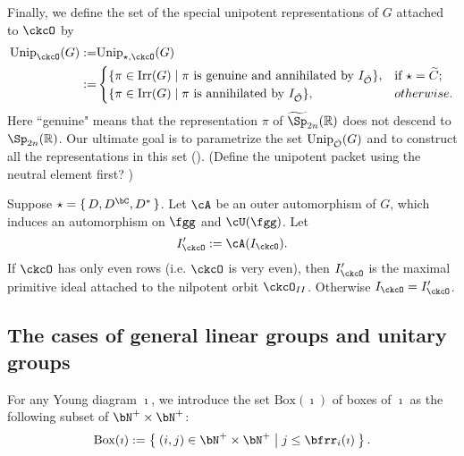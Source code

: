 \documentclass[counting_main.tex]{subfiles}
\begin{document}
Finally, we define the set of the special unipotent representations of $G$
attached to $\ckcO$ by
\[
  \begin{split}
    \Unip_{\ckcO}(G):=&  \Unip_{\star, \ckcO}(G) \\
    :=& \begin{cases}
      \{\pi\in \Irr(G)\mid \pi \textrm{ is genuine  and annihilated by } I_{\check \CO}\}, & \text{if } \star =\widetilde C;\\
      \{\pi\in \Irr(G)\mid \pi \textrm{ is annihilated by } I_{\check \CO}\}, & otherwise.\\
    \end{cases}
  \end{split}
\]
Here ``genuine" means that the representation $\pi$ of $\widetilde \Sp_{2n}(\R)$
does not descend to $\Sp_{2n}(\R)$. Our ultimate goal is to parametrize the set
$\mathrm{Unip}_{\check {{\mathcal {O}}}}(G)$ and to construct all the representations in this set
(\cite{BMSZ2}).
(Define the unipotent packet using the neutral element first? )

\begin{remark}
  Suppose $\star=\set{D,D^{\bC},D^{*}}$.
  Let $\cA$ be an outer automorphism of $G$, which induces an automorphism on
  $\fgg$ and $\cU(\fgg)$.
  Let
  \[
  I'_{\ckcO}:=\cA(I_{\ckcO}).
  \]
  If $\ckcO$ has only even rows (i.e. $\ckcO$ is very even),
  then $I'_{\ckcO}$ is the maximal primitive ideal attached to the nilpotent
  orbit $\ckcO_{II}$.
  Otherwise $I_{\ckcO}=I'_{\ckcO}$.
\end{remark}



\subsection{The cases of general linear groups and unitary groups}

For any Young diagram $\imath$, we introduce the set $\mathrm{Box}(\imath)$ of boxes of $\imath$ as the following subset
of $\bN^+\times \bN^+$:
\begin{equation}\label{eq:BOX}
\mathrm{Box}(\imath):=\Set{(i,j)\in\bN^+\times \bN^+| j\leq \bfrr_i(\imath)}.
\end{equation}
\end{document}
